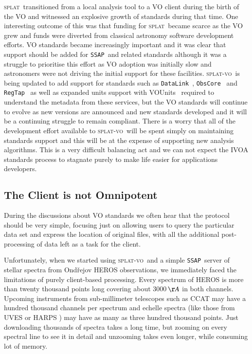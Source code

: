\documentclass[final,authoryear,5p,times,twocolumn]{elsarticle}
\newcommand{\datalink}{\texttt{DataLink}}
\newcommand{\ssap}{\texttt{SSAP}}
\newcommand{\regtap}{\texttt{RegTap}}
\newcommand{\obscore}{\texttt{ObsCore}}
\newcommand{\vounits}{VOUnits}
\newcommand{\splat}{\textsc{splat}}
\newcommand{\splatvo}{\textsc{splat-vo}}
\begin{document}
\splat\ transitioned from a local analysis tool to a VO client during
the birth of the VO and witnessed an explosive growth of standards
during that time. One interesting outcome of this was that funding for
\splat\ became scarce as the VO grew and funds were diverted from
classical astronomy software development efforts. VO standards became
increasingly important and it was clear that support should be added
for \ssap\ and related standards although it was a struggle to
prioritise this effort as VO adoption was initially slow and
astronomers were not driving the initial support for these
facilities. \splatvo\ is being updated to add support for standards
such as \datalink\ \citep{datalink}, \obscore\ \citep{obstap} and \regtap\ \citep{regtap} as well as expanded units support with
\vounits\ \citep{vounits} required to understand the metadata from these
services, but the VO standards will continue to evolve
as new versions are announced and new standards developed and it will
be a continuing struggle to remain compliant. There is a worry that
all of the development effort available to \splatvo\ will be spent
simply on maintaining standards support and this will be at the
expense of supporting new analysis algorithms. This is a very
difficult balancing act and we can not expect the IVOA standards
process to stagnate purely to make life easier for applications
developers.

\subsection{The Client is not Omnipotent}

During the discussions about VO standards we often hear that the
protocol should be very simple, focusing just on allowing users to
query the particular data set and express the location of original
files, with all the additional post-processing of data left as a task
for the client.

Unfortunately, when we started using \splatvo\ and a simple \ssap\ server
of stellar spectra from Ond\v{r}ejov HEROS observations, we
immediately faced the limitations of purely client-based
processing. Every spectrum of HEROS \citep{2002PAICz..90....1S} is more than twenty thousand
points long covering about 3000\,$\AA$ in both channels. Upcoming
instruments from sub-millimeter telescopes such as CCAT
\citep{jenness_adassxxiii} may have a hundred thousand channels per
spectrum and echelle spectra (like those from UVES
\citep{2000SPIE.4008..534D} or HARPS \citep{2000SPIE.4008..582P}) may have
as many as three hundred thousand points. Just downloading thousands
of spectra takes a long time, but zooming on every spectral line to
see it in detail and unzooming takes even longer, while consuming lot
of memory.
\end{document}
